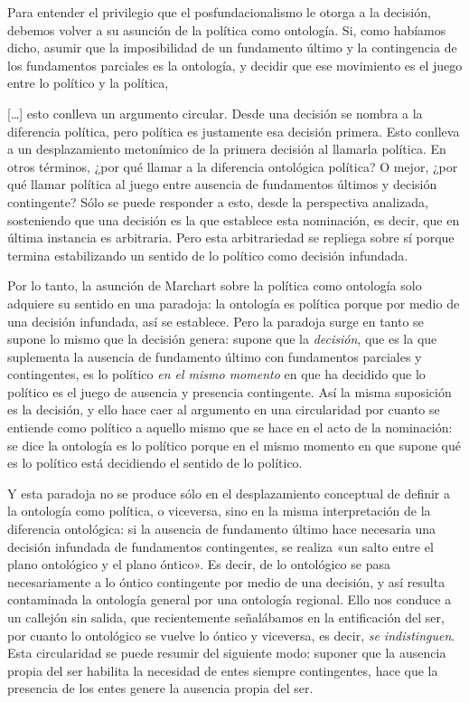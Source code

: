 Para entender el privilegio que el posfundacionalismo le otorga a la decisión, debemos volver a su asunción de la política como ontología. Si, como habíamos dicho, asumir que la imposibilidad de un fundamento último y la contingencia de los fundamentos parciales es la ontología, y decidir que ese movimiento es el juego entre lo político y la política,

{[}\ldots{]} esto conlleva un argumento circular. Desde una decisión se nombra a la diferencia política, pero política es justamente esa decisión primera. Esto conlleva a un desplazamiento metonímico de la primera decisión al llamarla política. En otros términos, ¿por qué llamar a la diferencia ontológica política? O mejor, ¿por qué llamar política al juego entre ausencia de fundamentos últimos y decisión contingente? Sólo se puede responder a esto, desde la perspectiva analizada, sosteniendo que una decisión es la que establece esta nominación, es decir, que en última instancia es arbitraria. Pero esta arbitrariedad se repliega sobre sí porque termina estabilizando un sentido de lo político como decisión infundada.

Por lo tanto, la asunción de Marchart sobre la política como ontología solo adquiere su sentido en una paradoja: la ontología es política porque por medio de una decisión infundada, así se establece. Pero la paradoja surge en tanto se supone lo mismo que la decisión genera: supone que la \emph{decisión}, que es la que suplementa la ausencia de fundamento último con fundamentos parciales y contingentes, es lo político \emph{en el mismo momento} en que ha decidido que lo político es el juego de ausencia y presencia contingente. Así la misma suposición es la decisión, y ello hace caer al argumento en una circularidad por cuanto se entiende como político a aquello mismo que se hace en el acto de la nominación: se dice la ontología es lo político porque en el mismo momento en que supone qué es lo político está decidiendo el sentido de lo político.

Y esta paradoja no se produce sólo en el desplazamiento conceptual de definir a la ontología como política, o viceversa, sino en la misma interpretación de la diferencia ontológica: si la ausencia de fundamento último hace necesaria una decisión infundada de fundamentos contingentes, se realiza «un salto entre el plano ontológico y el plano óntico». Es decir, de lo ontológico se pasa necesariamente a lo óntico contingente por medio de una decisión, y así resulta contaminada la ontología general por una ontología regional. Ello nos conduce a un callejón sin salida, que recientemente señalábamos en la entificación del ser, por cuanto lo ontológico se vuelve lo óntico y viceversa, es decir, \emph{se indistinguen}. Esta circularidad se puede resumir del siguiente modo: suponer que la ausencia propia del ser habilita la necesidad de entes siempre contingentes, hace que la presencia de los entes genere la ausencia propia del ser.

